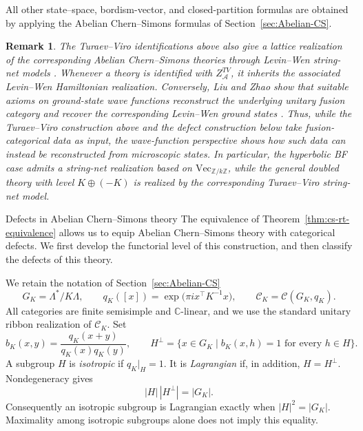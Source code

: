\documentclass[12pt]{amsart}
\makeatletter
\renewcommand\section{\@startsection{section}{1}%
  \z@{.7\linespacing\@plus\linespacing}{.5\linespacing}%
  {\normalfont\bfseries\centering}}
\numberwithin{equation}{section}
\newtheorem*{remark}{Remark}
\theoremstyle{definition}
\makeatother
\begin{document}
All other state--space, bordism-vector, and closed-partition formulas are obtained by applying the Abelian Chern--Simons formulas of Section~\ref{sec:Abelian-CS}.

\begin{remark}
The Turaev--Viro identifications above also give a lattice realization of the corresponding Abelian Chern--Simons theories through Levin--Wen string-net models \cite{LevinWen05}. Whenever a theory is identified with $Z^{TV}_{\mathcal A}$, it inherits the associated Levin--Wen Hamiltonian realization. Conversely, Liu and Zhao show that suitable axioms on ground-state wave functions reconstruct the underlying unitary fusion category and recover the corresponding Levin--Wen ground states \cite{LiuZhao2026}. Thus, while the Turaev--Viro construction above and the defect construction below take fusion-categorical data as input, the wave-function perspective shows how such data can instead be reconstructed from microscopic states. In particular, the hyperbolic BF case admits a string-net realization based on $\mathrm{Vec}_{\mathbb Z/k\mathbb Z}$, while the general doubled theory with level $K\oplus(-K)$ is realized by the corresponding Turaev--Viro string-net model.
\end{remark}

\section{Defects in Abelian Chern--Simons theory}
\label{sec:defects}
The equivalence of Theorem~\ref{thm:cs-rt-equivalence} allows us to equip Abelian Chern--Simons theory with categorical defects. We first develop the functorial level of this construction, and then classify the defects of this theory. 


We retain the notation of Section~\ref{sec:Abelian-CS}
$$
G_K=\Lambda^*/K\Lambda,\qquad
q_K([x])=\exp\!\bigl(\pi i x^\top K^{-1}x\bigr),\qquad
\mathcal C_K=\mathcal C(G_K,q_K).
$$
All categories are finite semisimple and $\mathbb C$-linear, and we use
the standard unitary ribbon realization of $\mathcal C_K$. Set
$$
b_K(x,y)=\frac{q_K(x+y)}{q_K(x)q_K(y)},\qquad
H^\perp=\{x\in G_K\mid b_K(x,h)=1\text{ for every }h\in H\}.
$$
A subgroup $H$ is \emph{isotropic} if $q_K|_H=1$. It is
\emph{Lagrangian} if, in addition, $H=H^\perp$. Nondegeneracy gives
\begin{equation}
\label{eq:defects-perp-order}
|H|\,|H^\perp|=|G_K|.
\end{equation}
Consequently an isotropic subgroup is Lagrangian exactly when
$|H|^2=|G_K|$. Maximality among isotropic subgroups alone does not
imply this equality.
\end{document}
